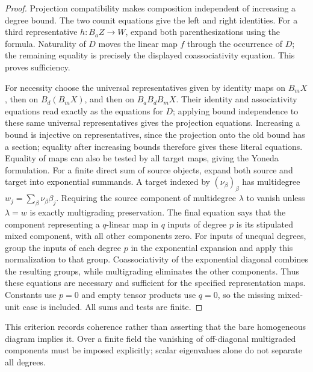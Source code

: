 \documentclass[11pt,a4paper]{article}
\theoremstyle{definition}
\begin{document}
\begin{proof}
Projection compatibility makes composition independent of increasing a degree bound. The two counit equations give the left and right identities. For a third representative $h:B_aZ\to W$, expand both parenthesizations using the formula. Naturality of $D$ moves the linear map $f$ through the occurrence of $D$; the remaining equality is precisely the displayed coassociativity equation. This proves sufficiency.

For necessity choose the universal representatives given by identity maps on $B_mX$, then on $B_d(B_mX)$, and then on $B_aB_dB_mX$. Their identity and associativity equations read exactly as the equations for $D$; applying bound independence to these same universal representatives gives the projection equations. Increasing a bound is injective on representatives, since the projection onto the old bound has a section; equality after increasing bounds therefore gives these literal equations. Equality of maps can also be tested by all target maps, giving the Yoneda formulation. For a finite direct sum of source objects, expand both source and target into exponential summands. A target indexed by $(\nu_\beta)_\beta$ has multidegree $w_j=\sum_\beta\nu_\beta\beta_j$. Requiring the source component of multidegree $\lambda$ to vanish unless $\lambda=w$ is exactly multigrading preservation. The final equation says that the component representing a $q$-linear map in $q$ inputs of degree $p$ is its stipulated mixed component, with all other components zero. For inputs of unequal degrees, group the inputs of each degree $p$ in the exponential expansion and apply this normalization to that group. Coassociativity of the exponential diagonal combines the resulting groups, while multigrading eliminates the other components. Thus these equations are necessary and sufficient for the specified representation maps. Constants use $p=0$ and empty tensor products use $q=0$, so the missing mixed-unit case is included. All sums and tests are finite.
\end{proof}

This criterion records coherence rather than asserting that the bare homogeneous diagram implies it. Over a finite field the vanishing of off-diagonal multigraded components must be imposed explicitly; scalar eigenvalues alone do not separate all degrees.
\end{document}
